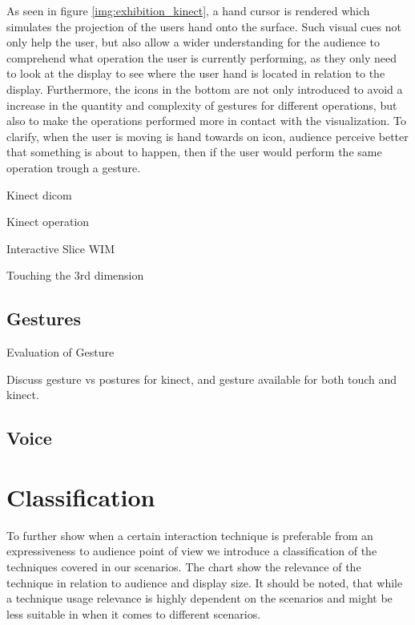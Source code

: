 \documentclass[review,journal]{vgtc}         %
\begin{document}
As seen in figure \ref{img:exhibition_kinect}, a hand cursor is rendered which simulates the projection of the users hand onto the surface. Such visual cues not only help the user, but also allow a wider understanding for the audience to comprehend what operation the user is currently performing, as they only need to look at the display to see where the user hand is located in relation to the display. Furthermore, the icons in the bottom are not only introduced to avoid a increase in the quantity and complexity of gestures for different operations, but also to make the operations performed more in contact with the visualization. To clarify, when the user is moving is hand towards on icon, audience perceive better that something is about to happen, then if the user would perform the same operation trough a gesture.

Kinect dicom \cite{zora82163}

Kinect operation \cite{OHaraGSPVMCCRDC14}

Interactive Slice WIM \cite{Coffey:2012:ISW:2360744.2360843}


Touching the 3rd dimension \cite{DBLP:journals/dagstuhl-reports/KeefeKSR12}

\subsection{Gestures}

Evaluation of Gesture \cite{Kirmizibayrak:2011:EGB:2087756.2087764}

Discuss gesture vs postures \cite{isenberg:hal-00781237} for kinect, and gesture available for both touch and kinect.

\subsection{Voice}

\section{Classification}

To further show when a certain interaction technique is preferable from an expressiveness to audience point of view we introduce a classification of the techniques covered in our scenarios. The chart show the relevance of the technique in relation to audience and display size. It should be noted, that while a technique usage relevance is highly dependent on the scenarios and might be less suitable in when it comes to different scenarios.
\end{document}
